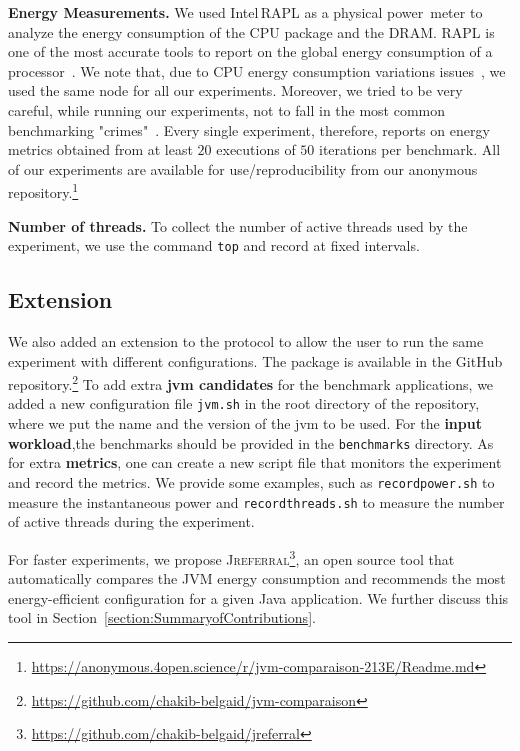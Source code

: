 
\noindent\textbf{Energy Measurements.}
We used Intel\,RAPL as a physical power~meter to analyze the energy consumption of the CPU package and the DRAM.
RAPL is one of the most accurate tools to report on the global energy consumption of a processor~\cite{Khan:2018:RAE:3199681.3177754,10.1145/2989081.2989088}.
We note that, due to CPU energy consumption variations issues~\cite{opaper}, we used the same node for all our experiments.
Moreover, we tried to be very careful, while running our experiments, not to fall in the most common benchmarking "crimes"~\cite{crimes}.
Every single experiment, therefore, reports on energy metrics obtained from at least $20$ executions of $50$ iterations per benchmark.
All of our experiments are available for use/reproducibility from our anonymous repository.\footnote{\url{https://anonymous.4open.science/r/jvm-comparaison-213E/Readme.md}}


\noindent\textbf{Number of threads.}
To collect the number of active threads used by the experiment, we use the command \texttt{top} and record at fixed intervals.

\subsection{Extension}
We also added an extension to the protocol to allow the user to run the same experiment with different configurations.
The package is available in the GitHub repository.\footnote{\url{https://github.com/chakib-belgaid/jvm-comparaison}}
To add extra \textbf{jvm candidates} for the benchmark applications, we added a new configuration file \texttt{jvm.sh} in the root directory of the repository, where we put the name and the version of the jvm to be used.
For the \textbf{input workload},the benchmarks should be provided in the \texttt{benchmarks} directory.
As for extra \textbf{metrics}, one can create a new script file that monitors the experiment and record the metrics.
We provide some examples, such as \texttt{recordpower.sh} to measure the instantaneous power and \texttt{recordthreads.sh} to measure the number of active threads during the experiment.

For faster experiments, we propose \textsc{Jreferral}\footnote{\url{https://github.com/chakib-belgaid/jreferral}}, an open source tool that automatically compares the JVM energy consumption and recommends the most energy-efficient configuration for a given Java application.
We further discuss this tool in Section~\ref{section:SummaryofContributions}.


